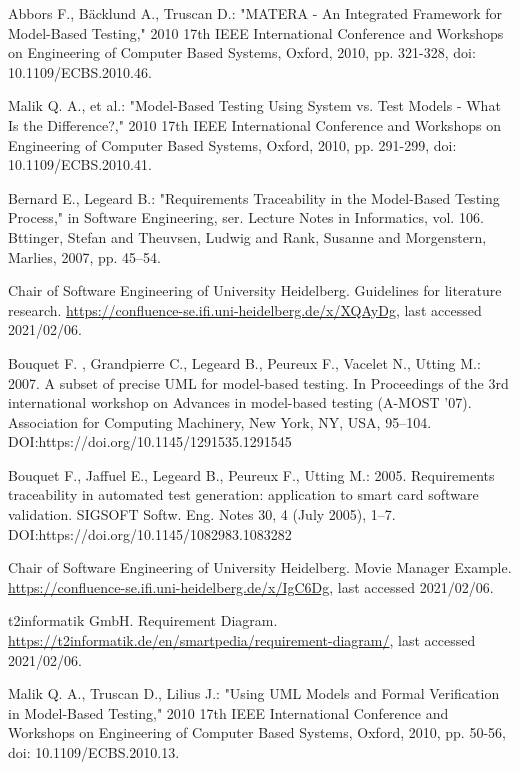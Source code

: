\documentclass[a4paper,10pt, bibliography=totocnumbered]{scrreprt}
\begin{document}
\begin{thebibliography}{9}
 Abbors F., Bäcklund A., Truscan D.: "MATERA - An Integrated Framework for Model-Based Testing," 2010 17th IEEE International Conference and Workshops on Engineering of Computer Based Systems, Oxford, 2010, pp. 321-328, doi: 10.1109/ECBS.2010.46.

 Malik Q. A., et al.: "Model-Based Testing Using System vs. Test Models - What Is the Difference?," 2010 17th IEEE International Conference and Workshops on Engineering of Computer Based Systems, Oxford, 2010, pp. 291-299, doi: 10.1109/ECBS.2010.41.

 Bernard E., Legeard B.: "Requirements Traceability in the Model-Based Testing Process,"  in Software Engineering, ser. Lecture Notes in Informatics, vol. 106. Bttinger, Stefan and Theuvsen, Ludwig and Rank, Susanne and Morgenstern, Marlies, 2007, pp. 45–54.

 Chair of Software Engineering of University Heidelberg. Guidelines for literature research.
\url{https://confluence-se.ifi.uni-heidelberg.de/x/XQAyDg}, last accessed 2021/02/06. 

 Bouquet F. , Grandpierre C., Legeard B., Peureux F., Vacelet N., Utting M.: 2007. A subset of precise UML for model-based testing. In Proceedings of the 3rd international workshop on Advances in model-based testing (A-MOST '07). Association for Computing Machinery, New York, NY, USA, 95–104. DOI:https://doi.org/10.1145/1291535.1291545

 Bouquet F., Jaffuel E., Legeard B., Peureux F., Utting M.: 2005. Requirements traceability in automated test generation: application to smart card software validation. SIGSOFT Softw. Eng. Notes 30, 4 (July 2005), 1–7. DOI:https://doi.org/10.1145/1082983.1083282

 Chair of Software Engineering of University Heidelberg. Movie Manager Example. 
\url{https://confluence-se.ifi.uni-heidelberg.de/x/IgC6Dg}, last accessed 2021/02/06. 

 t2informatik GmbH. Requirement Diagram.
\url{https://t2informatik.de/en/smartpedia/requirement-diagram/}, last accessed 2021/02/06. 

 Malik Q. A., Truscan D., Lilius J.: "Using UML Models and Formal Verification in Model-Based Testing," 2010 17th IEEE International Conference and Workshops on Engineering of Computer Based Systems, Oxford, 2010, pp. 50-56, doi: 10.1109/ECBS.2010.13.


\end{thebibliography}
\end{document}
